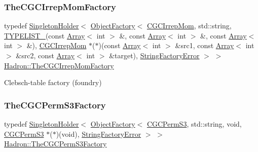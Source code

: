 \subsubsection{\texorpdfstring{TheCGCIrrepMomFactory}{TheCGCIrrepMomFactory}}
{\footnotesize\ttfamily typedef \mbox{\hyperlink{classUtil_1_1SingletonHolder}{Singleton\+Holder}}$<$ \mbox{\hyperlink{classUtil_1_1ObjectFactory}{Object\+Factory}}$<$ \mbox{\hyperlink{classHadron_1_1CGCIrrepMom}{C\+G\+C\+Irrep\+Mom}}, std\+::string, \mbox{\hyperlink{install_2include_2adat_2typelist_8h_a0309f68a543c5c0994f9edc0e56dc59f}{T\+Y\+P\+E\+L\+I\+S\+T\+\_}}(const \mbox{\hyperlink{classXMLArray_1_1Array}{Array}}$<$ int $>$ \&, const \mbox{\hyperlink{classXMLArray_1_1Array}{Array}}$<$ int $>$ \&, const \mbox{\hyperlink{classXMLArray_1_1Array}{Array}}$<$ int $>$ \&), \mbox{\hyperlink{classHadron_1_1CGCIrrepMom}{C\+G\+C\+Irrep\+Mom}} $\ast$($\ast$)(const \mbox{\hyperlink{classXMLArray_1_1Array}{Array}}$<$ int $>$ \&src1, const \mbox{\hyperlink{classXMLArray_1_1Array}{Array}}$<$ int $>$ \&src2, const \mbox{\hyperlink{classXMLArray_1_1Array}{Array}}$<$ int $>$ \&target), \mbox{\hyperlink{structUtil_1_1StringFactoryError}{String\+Factory\+Error}} $>$ $>$ \mbox{\hyperlink{namespaceHadron_a4657a351a06d86fb997a0765f97e3f13}{Hadron\+::\+The\+C\+G\+C\+Irrep\+Mom\+Factory}}}



Clebsch-\/table factory (foundry) 

\mbox{\label{namespaceHadron_a5dba98c73cf8d3f64496a084c7e3d16c}} 
\subsubsection{\texorpdfstring{TheCGCPermS3Factory}{TheCGCPermS3Factory}}
{\footnotesize\ttfamily typedef \mbox{\hyperlink{classUtil_1_1SingletonHolder}{Singleton\+Holder}}$<$ \mbox{\hyperlink{classUtil_1_1ObjectFactory}{Object\+Factory}}$<$ \mbox{\hyperlink{classHadron_1_1CGCPermS3}{C\+G\+C\+Perm\+S3}}, std\+::string, void, \mbox{\hyperlink{classHadron_1_1CGCPermS3}{C\+G\+C\+Perm\+S3}} $\ast$($\ast$)(void), \mbox{\hyperlink{structUtil_1_1StringFactoryError}{String\+Factory\+Error}} $>$ $>$ \mbox{\hyperlink{namespaceHadron_a5dba98c73cf8d3f64496a084c7e3d16c}{Hadron\+::\+The\+C\+G\+C\+Perm\+S3\+Factory}}}



